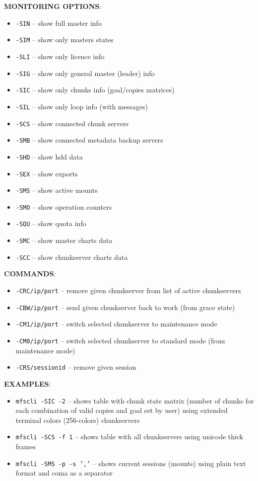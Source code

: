 \documentclass[a4paper,11pt,english]{report}
\def\code#1{\texttt{#1}}
\begin{document}
				\textbf{MONITORING OPTIONS}:
				\begin{itemize}
					\item \code{-SIN} -- show full master info
					\item \code{-SIM} -- show only masters states
					\item \code{-SLI} -- show only licence info
					\item \code{-SIG} -- show only general master (leader) info
					\item \code{-SIC} -- show only chunks info (goal/copies matrices)
					\item \code{-SIL} -- show only loop info (with messages)
					\item \code{-SCS} -- show connected chunk servers
					\item \code{-SMB} -- show connected metadata backup servers
					\item \code{-SHD} -- show hdd data
					\item \code{-SEX} -- show exports
					\item \code{-SMS} -- show active mounts
					\item \code{-SMO} -- show operation counters
					\item \code{-SQU} -- show quota info
					\item \code{-SMC} -- show master charts data
					\item \code{-SCC} -- show chunkserver charts data
				\end{itemize}
				\bigskip
				
				\textbf{COMMANDS}:
				\begin{itemize}
					\item \code{-CRC/ip/port} -- remove given chunkserver from list of active chunkservers
					\item \code{-CBW/ip/port} -- send given chunkserver back to work (from grace state)
					\item \code{-CM1/ip/port} -- switch selected chunkserver to maintenance mode
					\item \code{-CM0/ip/port} -- switch selected chunkserver to standard mode (from maintenance mode)
					\item \code{-CRS/sessionid} -- remove given session
				\end{itemize}
				\bigskip
				
				\textbf{EXAMPLES}:
				\begin{itemize}
					\item \code{mfscli -SIC -2} -- shows table with chunk state matrix (number of chunks for each combination of valid copies and goal set by user) using extended terminal colors (256-colors) chunkservers
					\item \code{mfscli -SCS -f 1} -- shows table with all chunkservers using unicode thick frames
					\item \code{mfscli -SMS -p -s ','} -- shows current sessions (mounts) using plain text format and coma as a separator
				\end{itemize}
				
\end{document}
